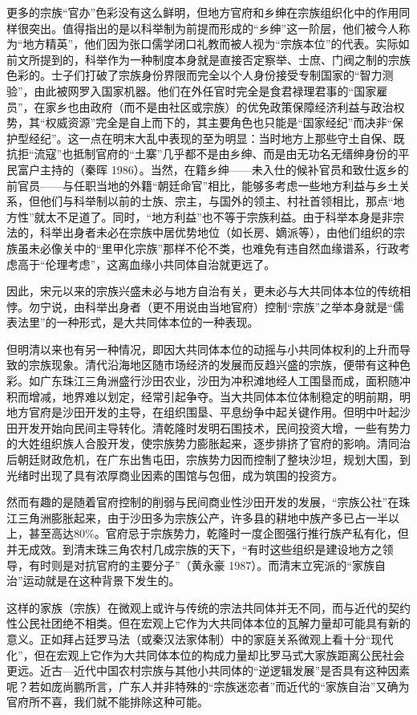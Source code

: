 \documentclass[a4paper,12pt,punct=kaiming]{ctexart}
\begin{document}
更多的宗族“官办”色彩没有这么鲜明，但地方官府和乡绅在宗族组织化中的作用同样很突出。值得指出的是以科举制为前提而形成的“乡绅”这一阶层，他们被今人称为“地方精英”，他们因为张口儒学闭口礼教而被人视为“宗族本位”的代表。实际如前文所提到的，科举作为一种制度本身就是直接否定察举、士庶、门阀之制的宗族色彩的。士子们打破了宗族身份界限而完全以个人身份接受专制国家的“智力测验”，由此被网罗入国家机器。他们在外任官时完全是食君禄理君事的“国家雇员”，在家乡也由政府（而不是由社区或宗族）的优免政策保障经济利益与政治权势，其“权威资源”完全是自上而下的，其主要角色也只能是“国家经纪”而决非“保护型经纪”。这一点在明末大乱中表现的至为明显：当时地方上那些守土自保、既抗拒“流寇”也抵制官府的“土寨”几乎都不是由乡绅、而是由无功名无缙绅身份的平民富户主持的（秦晖 1986）。当然，在籍乡绅——未入仕的候补官员和致仕返乡的前官员——与任职当地的外籍“朝廷命官”相比，能够多考虑一些地方利益与乡土关系，但他们与科举制以前的士族、宗主，与国外的领主、村社首领相比，那点“地方性”就太不足道了。同时，“地方利益”也不等于宗族利益。由于科举本身是非宗法的，科举出身者未必在宗族中居优势地位（如长房、嫡派等），由他们组织的宗族虽未必像关中的“里甲化宗族”那样不伦不类，也难免有违自然血缘谱系，行政考虑高于“伦理考虑”，这离血缘小共同体自治就更远了。

因此，宋元以来的宗族兴盛未必与地方自治有关，更未必与大共同体本位的传统相悖。勿宁说，由科举出身者（更不用说由当地官府）控制“宗族”之举本身就是“儒表法里”的一种形式，是大共同体本位的一种表现。

但明清以来也有另一种情况，即因大共同体本位的动摇与小共同体权利的上升而导致的宗族现象。清代沿海地区随市场经济的发展而反趋兴盛的宗族，便带有这种色彩。如广东珠江三角洲盛行沙田农业，沙田为冲积滩地经人工围垦而成，面积随冲积而增减，地界难以划定，经常引起争夺。当大共同体本位体制稳定的明前期，明地方官府是沙田开发的主导，在组织围垦、平息纷争中起关键作用。但明中叶起沙田开发开始向民间主导转化。清乾隆时发明石围技术，民间投资大增，一些有势力的大姓组织族人合股开发，使宗族势力膨胀起来，逐步排挤了官府的影响。清同治后朝廷财政危机，在广东出售屯田，宗族势力因而控制了整块沙坦，规划大围，到光绪时出现了具有浓厚商业因素的围馆与包佃，成为筑围的投资方。

然而有趣的是随着官府控制的削弱与民间商业性沙田开发的发展，“宗族公社”在珠江三角洲膨胀起来，由于沙田多为宗族公产，许多县的耕地中族产多已占一半以上，甚至高达80\%。官府忌于宗族势力，乾隆时一度企图强行推行族产私有化，但并无成效。到清末珠三角农村几成宗族的天下，“有时这些组织是建设地方之领导，有时则是对抗官府的主要分子”（黄永豪 1987）。而清末立宪派的“家族自治”运动就是在这种背景下发生的。

这样的家族（宗族）在微观上或许与传统的宗法共同体并无不同，而与近代的契约性公民社团绝不相类。但在宏观上它作为大共同体本位的瓦解力量却可能具有新的意义。正如拜占廷罗马法（或秦汉法家体制）中的家庭关系微观上看十分“现代化”，但在宏观上它作为大共同体本位的构成力量却比罗马式大家族距离公民社会更远。近古—近代中国农村宗族与其他小共同体的“逆逻辑发展”是否具有这种因素呢？若如庞尚鹏所言，广东人并非特殊的“宗族迷恋者”而近代的“家族自治”又确为官府所不喜，我们就不能排除这种可能。
\end{document}
